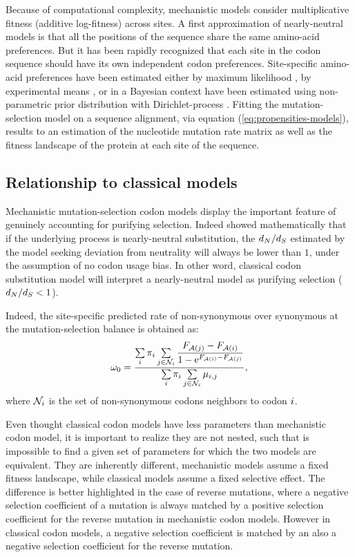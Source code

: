 Because of computational complexity, mechanistic models consider multiplicative fitness (additive log-fitness) across sites.
A first approximation of \gls{nearly-neutral} models is that all the positions of the sequence share the same amino-acid preferences.
But it has been rapidly recognized that each site in the \gls{codon} sequence should have its own independent \gls{codon} preferences.
Site-specific amino-acid preferences have been estimated either by maximum \gls{likelihood} \citep{Tamuri2012,Tamuri2014}, by experimental means \citep{Bloom2017}, or in a Bayesian context have been estimated using non-parametric
prior distribution with \gls{Dirichlet-process} \citep{Rodrigue2010, Rodrigue2014}.
Fitting the mutation-selection model on a sequence alignment, via equation (\ref{eq:propensities-models}), results to an estimation of the nucleotide mutation rate matrix as well as the fitness landscape of the protein at each site of the sequence.

\subsection{Relationship to classical models}
Mechanistic mutation-selection \gls{codon} models display the important feature of genuinely accounting for purifying selection.
Indeed \citet{Spielman2015} showed mathematically that if the underlying process is \gls{nearly-neutral} \gls{substitution}, the $d_N / d_S$ estimated by the model seeking deviation from neutrality will always be lower than $1$, under the assumption of no \gls{codon} usage bias.
In other word, classical \gls{codon} \gls{substitution} model will interpret a \gls{nearly-neutral} model as purifying selection ($d_N / d_S < 1$).

Indeed, the site-specific predicted rate of non-synonymous over \gls{synonymous} at the mutation-selection balance is obtained as: 
\begin{equation}
\omega_0 = \dfrac{ \sum\limits_{i} \pi_{i} \sum\limits_{j \in \mathcal{N}_{{i}}} \dfrac{F_{\mathcal{A}({j})} - F_{\mathcal{A}({i})}}{1 - \mathrm{e}^{F_{\mathcal{A}({i})} - F_{\mathcal{A}({j})}} }}{\sum\limits_{i} \pi_{i} \sum\limits_{j \in \mathcal{N}_{{i}} } \mu_{{i}, {j}}},
\end{equation}
where $\mathcal{N}_{{i}}$ is the set of non-synonymous \glspl{codon} neighbors to \gls{codon} ${i}$.

Even thought classical \gls{codon} models have less parameters than mechanistic \gls{codon} model, it is important to realize they are not nested, such that is impossible to find a given set of parameters for which the two models are equivalent.
They are inherently different, mechanistic models assume a fixed fitness landscape, while classical models assume a fixed selective effect.
The difference is better highlighted in the case of reverse mutations, where a negative selection coefficient of a mutation is always matched by a positive selection coefficient for the reverse mutation in mechanistic \gls{codon} models.
However in classical \gls{codon} models, a negative selection coefficient is matched by an also a negative selection coefficient for the reverse mutation.

